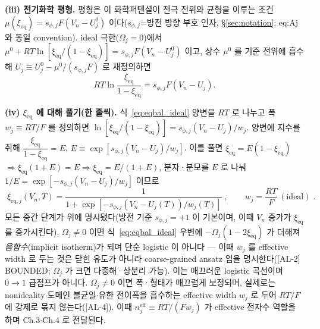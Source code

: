 \documentclass[11pt,a4paper]{article}
\newcommand{\eff}{\mathrm{eff}}
\newcommand{\eq}{\mathrm{eq}}
\newcommand{\AL}[1]{\textsf{[AL-#1]}}
\begin{document}
\textbf{(iii) 전기화학 평형.} 평형은 이 화학퍼텐셜이 전극 전위와 균형을 이루는 조건
$\mu(\xi_\eq)=s_{\phi,j}F(V_n-U_j^0)$ 이다($s_{\phi,j}$=방전 방향 부호 인자, \S\ref{sec:notation};
eq:Aj 와 동일 convention). ideal 극한($\Omega_j=0$)에서 $\mu^0+RT\ln[\xi_\eq/(1-\xi_\eq)]
=s_{\phi,j}F(V_n-U_j^0)$ 이고, 상수 $\mu^0$ 를 기준 전위에 흡수해 $U_j\equiv U_j^0-\mu^0/(s_{\phi,j}F)$ 로
재정의하면
\begin{equation}
RT\ln\frac{\xi_\eq}{1-\xi_\eq}=s_{\phi,j}F(V_n-U_j).
\label{eq:eqbal_ideal}
\end{equation}

\textbf{(iv) $\xi_\eq$ 에 대해 풀기(한 줄씩).} 식~\eqref{eq:eqbal_ideal} 양변을 $RT$ 로 나누고 폭
$w_j\equiv RT/F$ 를 정의하면 $\ln[\xi_\eq/(1-\xi_\eq)]=s_{\phi,j}(V_n-U_j)/w_j$. 양변에 지수를 취해
$\dfrac{\xi_\eq}{1-\xi_\eq}=E$, $E\equiv\exp[s_{\phi,j}(V_n-U_j)/w_j]$. 이를 풀면 $\xi_\eq=E(1-\xi_\eq)$
$\Rightarrow\xi_\eq(1+E)=E\Rightarrow\xi_\eq=E/(1+E)$, 분자·분모를 $E$ 로 나눠 $1/E=\exp[-s_{\phi,j}(V_n-U_j)/w_j]$
이므로
\begin{equation}
\boxed{\;\xi_{\eq,j}(V_n,T)=\frac{1}{1+\exp[-s_{\phi,j}(V_n-U_j(T))/w_j(T)]}\;,\qquad w_j=\frac{RT}{F}\ (\text{ideal})\;.}
\label{eq:logistic}
\end{equation}
모든 중간 단계가 위에 명시됐다(방전 기준 $s_{\phi,j}=+1$ 이 기본이며, 이때 $V_n$ 증가가 $\xi_\eq$ 를 증가시킨다).
$\Omega_j\ne0$ 이면 식~\eqref{eq:eqbal_ideal} 우변에 $-\Omega_j(1-2\xi_\eq)$ 가 더해져 \emph{음함수}(implicit
isotherm)가 되며 단순 logistic 이 아니다 — 이때 $w_j$ 를 effective width 로 두는 것은 닫힌 유도가 아니라
coarse-grained ansatz 임을 명시한다(\AL{2} BOUNDED; $\Omega_j$ 가 크면 다중해·상분리 가능). 이는 매끄러운 logistic 곡선이며 $0\!\to\!1$ 급점프가
아니다. $\Omega_j\ne0$ 이면 폭·형태가 매끄럽게 보정되며, 실제로는 nonideality$\cdot$도메인 불균일$\cdot$유한
전이폭을 흡수하는 effective width $w_j$ 로 두어 $RT/F$ 에 강제로 묶지 않는다(\AL{4}). 이때
$n_j^{\eff}\equiv RT/(Fw_j)$ 가 effective 전자수 역할을 하며 Ch.3$\cdot$Ch.4 로 전달된다.
\end{document}
